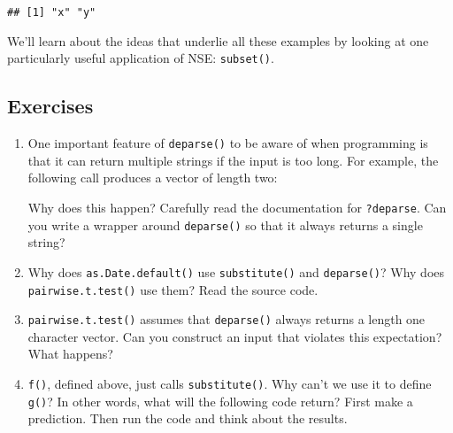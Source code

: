 \begin{verbatim}
## [1] "x" "y"
\end{verbatim}

We'll learn about the ideas that underlie all these examples by looking
at one particularly useful application of NSE: \texttt{subset()}.

\hypertarget{exercises}{%
\subsection{Exercises}\label{exercises}}

\begin{enumerate}
\def\labelenumi{\arabic{enumi}.}
\item
  One important feature of \texttt{deparse()} to be aware of when
  programming is that it can return multiple strings if the input is too
  long. For example, the following call produces a vector of length two:

\begin{Shaded}
\begin{Highlighting}[]
\OperatorTok{+}\StringTok{ }\OperatorTok{+}\StringTok{ }\OperatorTok{+}\StringTok{ }\OperatorTok{+}\StringTok{ }\OperatorTok{+}\StringTok{ }\OperatorTok{+}\StringTok{ }\OperatorTok{+}\StringTok{ }\OperatorTok{+}\StringTok{ }\OperatorTok{+}\StringTok{ }\OperatorTok{+}\StringTok{ }\OperatorTok{+}\StringTok{ }\OperatorTok{+}\StringTok{ }\OperatorTok{+}
\StringTok{  }\OperatorTok{+}\StringTok{ }\OperatorTok{+}\StringTok{ }\OperatorTok{+}\StringTok{ }\OperatorTok{+}\StringTok{ }\OperatorTok{+}\StringTok{ }\OperatorTok{+}\StringTok{ }\OperatorTok{+}\StringTok{ }\OperatorTok{+}\StringTok{ }\OperatorTok{+}\StringTok{ }\OperatorTok{+}\StringTok{ }\OperatorTok{+}\StringTok{ }\OperatorTok{+}\StringTok{ }
\end{Highlighting}
\end{Shaded}

  Why does this happen? Carefully read the documentation for
  \texttt{?deparse}. Can you write a wrapper around \texttt{deparse()}
  so that it always returns a single string?
\item
  Why does \texttt{as.Date.default()} use \texttt{substitute()} and
  \texttt{deparse()}? Why does \texttt{pairwise.t.test()} use them? Read
  the source code.
\item
  \texttt{pairwise.t.test()} assumes that \texttt{deparse()} always
  returns a length one character vector. Can you construct an input that
  violates this expectation? What happens?
\item
  \texttt{f()}, defined above, just calls \texttt{substitute()}. Why
  can't we use it to define \texttt{g()}? In other words, what will the
  following code return? First make a prediction. Then run the code and
  think about the results.


\end{enumerate}

